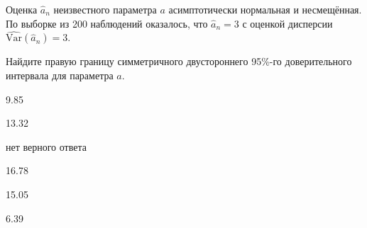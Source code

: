 
\begin{question}
Оценка \(\hat a_n\) неизвестного параметра \(a\) асимптотически
нормальная и несмещённая. По выборке из 200 наблюдений оказалось, что
\(\hat a_n = 3\) с оценкой дисперсии
\(\widehat{\mathrm{Var}}(\hat a_n) = 3\).

Найдите правую границу симметричного двустороннего 95\%-го
доверительного интервала для параметра \(a\).
\begin{answerlist}
  \item 9.85
  \item 13.32
  \item нет верного ответа
  \item 16.78
  \item 15.05
  \item 6.39
\end{answerlist}
\end{question}



